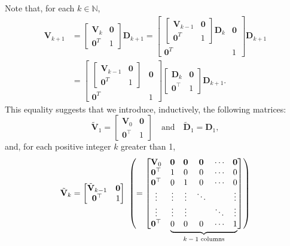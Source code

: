 \documentclass[11pt,a4paper]{article}
\newcommand\undermat[2]{%
  \makebox[0pt][l]{$\smash{\underbrace{\phantom{%
    \begin{bmatrix}#2\end{bmatrix}}}_{\text{$#1$}}}$}#2}
\newcommand{\0}{\M{0}}
\newcommand{\M}[1]{\mathbf{#1}}
\newcommand{\Mt}[1]{\tilde{\M{#1}}}
\newcommand{\N}{\mathbb{N}}
\newcommand{\T}{\top}
\begin{document}
Note that, for each $k \in \N$, 
\begin{align*}
  \M{V}_{k+1}
  &
    =
    \begin{bmatrix}
      \M{V}_k & \0
      \\
      \0^T & 1
    \end{bmatrix}
             \M{D}_{k+1}
             =
             \begin{bmatrix}
               \begin{bmatrix}
                 \M{V}_{k-1} & \0
                 \\
                 \0^T & 1
               \end{bmatrix}
               \M{D}_k & \0
               \\
               \0^T & 1
             \end{bmatrix}
                      \M{D}_{k+1}
  \\
  & =
    \begin{bmatrix}
      \begin{bmatrix}
        \M{V}_{k-1} & \0
        \\
        \0^T & 1
      \end{bmatrix}
      & \0
      \\
      \0^T & 1
    \end{bmatrix}
             \begin{bmatrix}
               \M{D}_k & \0
               \\
               \0^\T & 1
             \end{bmatrix}
                       \M{D}_{k+1}.
\end{align*}
This equality suggests that we introduce, inductively, the following matrices:
\begin{displaymath}
  \Mt{V}_1
  =
  \begin{bmatrix}
    \M{V}_0 & \0
    \\
    \0^\T & 1
  \end{bmatrix}
  \quad
  \text{and}
  \quad
  \Mt{D}_1 = \M{D}_1,
\end{displaymath}
and, for each positive integer $k$ greater than 1, 
\begin{displaymath}
  \Mt{V}_k
  =
  \begin{bmatrix}
    \Mt{V}_{k-1} & \0
    \\
    \0^\T & 1
  \end{bmatrix}
            \
            \left(=
            \begin{bmatrix}
              \M{V}_0 & \0 & \0 & \0 & \cdots & \0
              \\
              \0^\T & 1 & 0 &  0 & \cdots & 0
              \\
              \0^\T & 0 & 1 & 0 & \cdots & 0
              \\
              \vdots & \vdots & \vdots & \ddots & & \vdots 
              \\
              \vdots & \vdots & \vdots & & \ddots & \vdots 
              \\
              \0^\T & \undermat{\text{$k-1$ columns}}{0 & 0 & 0 & \cdots & 1}
            \end{bmatrix}
                                           \right)
\end{displaymath}
\end{document}
